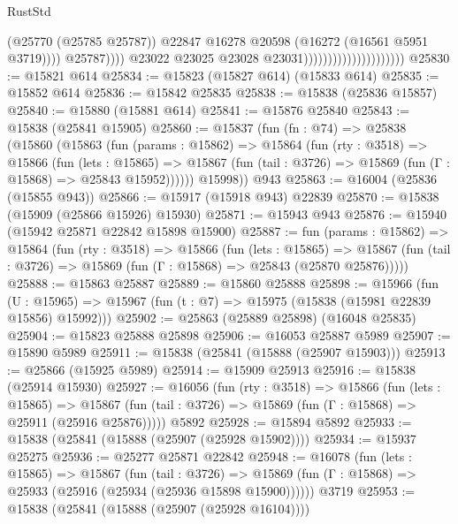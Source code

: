 \begin{lexlean}{RustStd}
\begin{coremodule}
                                                          (@25770 (@25785 @25787))
                                                          @22847
                                                          @16278
                                                          @20598
                                                          (@16272 (@16561 @5951 @3719))))
                                                      @25787))))
                                              @23022
                                              @23025
                                              @23028
                                              @23031)))))))))))))))))))))
@25830 := @15821 @614
@25834 := @15823 (@15827 @614) (@15833 @614)
@25835 := @15852 @614
@25836 := @15842 @25835
@25838 := @15838 (@25836 @15857)
@25840 := @15880 (@15881 @614)
@25841 := @15876 @25840
@25843 := @15838 (@25841 @15905)
@25860 := @15837
    (fun (fn : @74) =>
    @25838
      (@15860
        (@15863
          (fun (params : @15862) =>
          @15864
            (fun (rty : @3518) =>
            @15866
              (fun (lets : @15865) =>
              @15867 (fun (tail : @3726) => @15869 (fun (Γ : @15868) => @25843 @15952))))))
        @15998))
    @943
@25863 := @16004 (@25836 (@15855 @943))
@25866 := @15917 (@15918 @943) @22839
@25870 := @15838 (@15909 (@25866 @15926) @15930)
@25871 := @15943 @943
@25876 := @15940 (@15942 @25871 @22842 @15898 @15900)
@25887 := fun (params : @15862) =>
  @15864
    (fun (rty : @3518) =>
    @15866
      (fun (lets : @15865) =>
      @15867 (fun (tail : @3726) => @15869 (fun (Γ : @15868) => @25843 (@25870 @25876)))))
@25888 := @15863 @25887
@25889 := @15860 @25888
@25898 := @15966
    (fun (U : @15965) => @15967 (fun (t : @7) => @15975 (@15838 (@15981 @22839 @15856) @15992)))
@25902 := @25863 (@25889 @25898) (@16048 @25835)
@25904 := @15823 @25888 @25898
@25906 := @16053 @25887 @5989
@25907 := @15890 @5989
@25911 := @15838 (@25841 (@15888 (@25907 @15903)))
@25913 := @25866 (@15925 @5989)
@25914 := @15909 @25913
@25916 := @15838 (@25914 @15930)
@25927 := @16056
    (fun (rty : @3518) =>
    @15866
      (fun (lets : @15865) =>
      @15867 (fun (tail : @3726) => @15869 (fun (Γ : @15868) => @25911 (@25916 @25876)))))
    @5892
@25928 := @15894 @5892
@25933 := @15838 (@25841 (@15888 (@25907 (@25928 @15902))))
@25934 := @15937 @25275
@25936 := @25277 @25871 @22842
@25948 := @16078
    (fun (lets : @15865) =>
    @15867
      (fun (tail : @3726) =>
      @15869 (fun (Γ : @15868) => @25933 (@25916 (@25934 (@25936 @15898 @15900))))))
    @3719
@25953 := @15838 (@25841 (@15888 (@25907 (@25928 @16104))))

\end{coremodule}
\end{lexlean}
